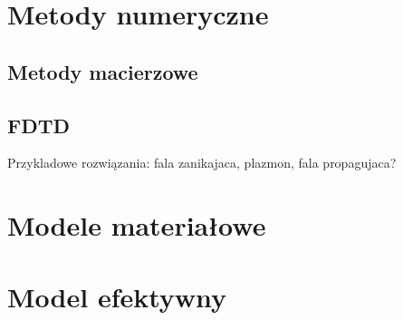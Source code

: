 \section{Metody numeryczne}
\subsection{Metody  macierzowe}
\subsection{FDTD}
Przykladowe rozwiązania: fala zanikajaca, plazmon, fala propagujaca?
\section{Modele materiałowe}
\section{Model efektywny}

